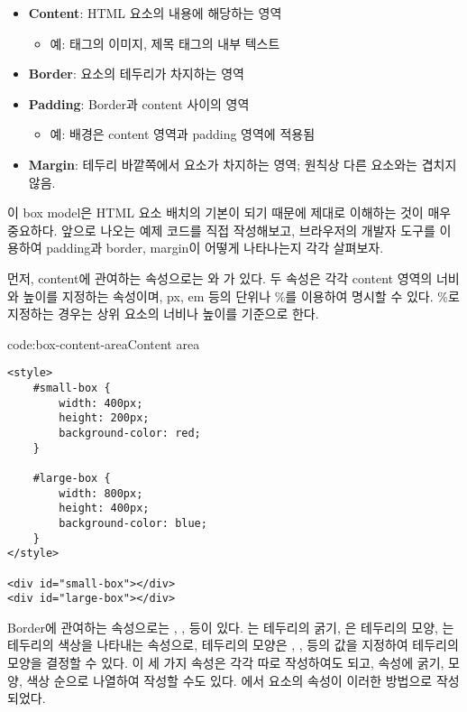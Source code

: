 \begin{itemize}
    \item \textbf{Content}: HTML 요소의 내용에 해당하는 영역
    \begin{itemize}
        \item 예:  태그의 이미지, 제목 태그의 내부 텍스트
    \end{itemize}
    \item \textbf{Border}: 요소의 테두리가 차지하는 영역
    \item \textbf{Padding}: Border과 content 사이의 영역
    \begin{itemize}
        \item 예: 배경은 content 영역과 padding 영역에 적용됨
    \end{itemize}
    \item \textbf{Margin}: 테두리 바깥쪽에서 요소가 차지하는 영역; 원칙상 다른 요소와는 겹치지 않음.
\end{itemize}

    {}

이 box model은 HTML 요소 배치의 기본이 되기 때문에 제대로 이해하는 것이 매우 중요하다. 앞으로 나오는 예제 코드를 직접 작성해보고, 브라우저의 개발자 도구를 이용하여 padding과 border, margin이 어떻게 나타나는지 각각 살펴보자.

먼저, content에 관여하는 속성으로는 와 가 있다. 두 속성은 각각 content 영역의 너비와 높이를 지정하는 속성이며, px, em 등의 단위나 \%를 이용하여 명시할 수 있다. \%로 지정하는 경우는 상위 요소의 너비나 높이를 기준으로 한다.

\begin{code}{code:box-content-area}{Content area}
\begin{verbatim}
<style>
    #small-box {
        width: 400px;
        height: 200px;
        background-color: red;
    }

    #large-box {
        width: 800px;
        height: 400px;
        background-color: blue;
    }
</style>

<div id="small-box"></div>
<div id="large-box"></div>
\end{verbatim}
\end{code}

Border에 관여하는 속성으로는 , ,  등이 있다. 는 테두리의 굵기, 은 테두리의 모양, 는 테두리의 색상을 나타내는 속성으로, 테두리의 모양은 , ,  등의 값을 지정하여 테두리의 모양을 결정할 수 있다. 이 세 가지 속성은 각각 따로 작성하여도 되고,  속성에 굵기, 모양, 색상 순으로 나열하여 작성할 수도 있다. 에서  요소의  속성이 이러한 방법으로 작성되었다.


